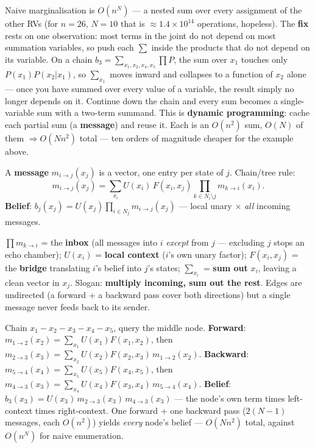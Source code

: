 \documentclass[11pt, a4paper]{article}
\newcommand{\kw}[1]{\textbf{#1}}
\begin{document}
Naive marginalisation is $O(n^N)$ — a nested sum over every assignment of the other RVs (for $n=26$,
$N=10$ that is $\approx 1.4\times10^{14}$ operations, hopeless). The \kw{fix} rests on one
observation: most terms in the joint do not depend on most summation variables, so push each $\sum$
inside the products that do not depend on its variable. On a chain
$b_3=\sum_{x_1,x_2,x_4,x_5}\prod P$, the sum over $x_1$ touches only $P(x_1)P(x_2|x_1)$, so
$\sum_{x_1}$ moves inward and collapses to a function of $x_2$ alone — once you have summed over
every value of a variable, the result simply no longer depends on it. Continue down the chain and
every sum becomes a single-variable sum with a two-term summand. This is \kw{dynamic programming}:
cache each partial sum (a \kw{message}) and reuse it. Each is an $O(n^2)$ sum, $O(N)$ of them
$\Rightarrow O(Nn^2)$ total — ten orders of magnitude cheaper for the example above.

\begin{defbox}
A \kw{message} $m_{i\to j}(x_j)$ is a vector, one entry per state of $j$. Chain/tree rule:
\[
m_{i\to j}(x_j)=\sum_{x_i}U(x_i)\,F(x_i,x_j)\!\!\prod_{k\in N_i\setminus j}\!\! m_{k\to i}(x_i).
\]
\kw{Belief}: $b_j(x_j)=U(x_j)\prod_{i\in N_j}m_{i\to j}(x_j)$ — local unary $\times$ \emph{all}
incoming messages.
\end{defbox}

\begin{notebox}
$\prod m_{k\to i}$ = the \kw{inbox} (all messages into $i$ \emph{except} from $j$ — excluding $j$
stops an echo chamber); $U(x_i)$ = \kw{local context} ($i$'s own unary factor); $F(x_i,x_j)$ = the
\kw{bridge} translating $i$'s belief into $j$'s states; $\sum_{x_i}$ = \kw{sum out} $x_i$, leaving a
clean vector in $x_j$. Slogan: \kw{multiply incoming, sum out the rest}. Edges are undirected (a
forward + a backward pass cover both directions) but a single message never feeds back to its sender.
\end{notebox}

\begin{exbox}
Chain $x_1\!-\!x_2\!-\!x_3\!-\!x_4\!-\!x_5$, query the middle node.
\kw{Forward}: $m_{1\to2}(x_2)=\sum_{x_1}U(x_1)F(x_1,x_2)$, then
$m_{2\to3}(x_3)=\sum_{x_2}U(x_2)F(x_2,x_3)\,m_{1\to2}(x_2)$.
\kw{Backward}: $m_{5\to4}(x_4)=\sum_{x_5}U(x_5)F(x_4,x_5)$, then
$m_{4\to3}(x_3)=\sum_{x_4}U(x_4)F(x_3,x_4)\,m_{5\to4}(x_4)$.
\kw{Belief}: $b_3(x_3)=U(x_3)\,m_{2\to3}(x_3)\,m_{4\to3}(x_3)$ — the node's own term times
left-context times right-context. One forward + one backward pass ($2(N{-}1)$ messages, each
$O(n^2)$) yields \emph{every} node's belief — $O(Nn^2)$ total, against $O(n^N)$ for naive
enumeration.
\end{exbox}
\end{document}
